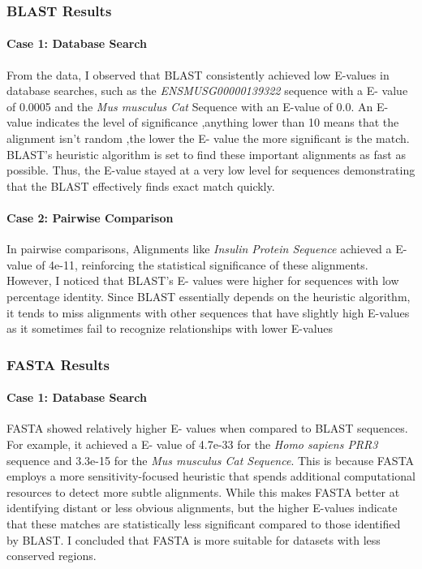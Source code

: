 \documentclass{article}
\begin{document}
\subsubsection{ BLAST Results}
\paragraph{Case 1: Database Search}
From the data, I observed that BLAST consistently achieved low E-values in database searches, such as the \textit{ENSMUSG00000139322} sequence with a E- value of 0.0005 and the \textit{Mus musculus Cat } Sequence with an E-value of 0.0. An E- value indicates the level of significance ,anything lower than 10 means that the alignment isn't random ,the lower the E- value the more significant is the match. BLAST’s heuristic algorithm is set to find these important alignments as fast as possible. Thus, the E-value stayed at a very low level for sequences demonstrating that the BLAST effectively finds exact match quickly.

\paragraph{Case 2: Pairwise Comparison}
In pairwise comparisons, Alignments like \textit{Insulin Protein Sequence} achieved a E- value of 4e-11, reinforcing the statistical significance of these alignments. However, I noticed that BLAST’s E- values were higher for sequences with low percentage identity.  Since BLAST essentially depends on the heuristic algorithm, it tends to miss alignments with other sequences that have slightly high E-values as it sometimes fail to recognize relationships with lower E-values

\subsubsection{ FASTA Results}

\paragraph{Case 1: Database Search}
FASTA showed relatively higher E- values when compared to BLAST sequences. For example, it achieved a E- value of 4.7e-33 for the \textit{Homo sapiens PRR3} sequence and 3.3e-15 for the \textit{Mus musculus Cat Sequence}. This is because FASTA employs a more sensitivity-focused heuristic that spends additional computational resources to detect more subtle alignments. While this makes FASTA better at identifying distant or less obvious alignments, but the higher E-values indicate that these matches are statistically less significant compared to those identified by BLAST. I concluded that FASTA is more suitable for datasets with less conserved regions.
\end{document}

